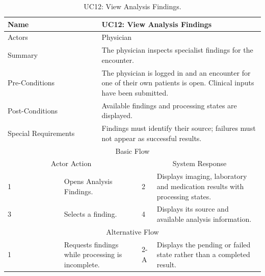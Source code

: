 \begin{table}[htbp]
\centering
\small
\caption{UC12: View Analysis Findings.}
\label{tab:kashaf:uc12}
\begin{tabular}{|p{}|p{}|p{}|p{}|p{}|}
\hline
\multicolumn{2}{|p{\dimexpr0.225\textwidth+2\tabcolsep+\arrayrulewidth\relax}|}{Name} & \multicolumn{3}{p{\dimexpr0.575\textwidth+4\tabcolsep+2\arrayrulewidth\relax}|}{UC12: View Analysis Findings} \\ \hline
\multicolumn{2}{|p{\dimexpr0.225\textwidth+2\tabcolsep+\arrayrulewidth\relax}|}{Actors} & \multicolumn{3}{p{\dimexpr0.575\textwidth+4\tabcolsep+2\arrayrulewidth\relax}|}{Physician} \\ \hline
\multicolumn{2}{|p{\dimexpr0.225\textwidth+2\tabcolsep+\arrayrulewidth\relax}|}{Summary} & \multicolumn{3}{p{\dimexpr0.575\textwidth+4\tabcolsep+2\arrayrulewidth\relax}|}{The physician inspects specialist findings for the encounter.} \\ \hline
\multicolumn{2}{|p{\dimexpr0.225\textwidth+2\tabcolsep+\arrayrulewidth\relax}|}{Pre-Conditions} & \multicolumn{3}{p{\dimexpr0.575\textwidth+4\tabcolsep+2\arrayrulewidth\relax}|}{The physician is logged in and an encounter for one of their own patients is open. Clinical inputs have been submitted.} \\ \hline
\multicolumn{2}{|p{\dimexpr0.225\textwidth+2\tabcolsep+\arrayrulewidth\relax}|}{Post-Conditions} & \multicolumn{3}{p{\dimexpr0.575\textwidth+4\tabcolsep+2\arrayrulewidth\relax}|}{Available findings and processing states are displayed.} \\ \hline
\multicolumn{2}{|p{\dimexpr0.225\textwidth+2\tabcolsep+\arrayrulewidth\relax}|}{Special Requirements} & \multicolumn{3}{p{\dimexpr0.575\textwidth+4\tabcolsep+2\arrayrulewidth\relax}|}{Findings must identify their source; failures must not appear as successful results.} \\ \hline
\multicolumn{5}{|c|}{Basic Flow} \\ \hline
\multicolumn{3}{|c|}{Actor Action} & \multicolumn{2}{c|}{System Response} \\ \hline
1 & \multicolumn{2}{p{\dimexpr0.37\textwidth+2\tabcolsep+\arrayrulewidth\relax}|}{Opens Analysis Findings.} & 2 & Displays imaging, laboratory and medication results with processing states. \\ \hline
3 & \multicolumn{2}{p{\dimexpr0.37\textwidth+2\tabcolsep+\arrayrulewidth\relax}|}{Selects a finding.} & 4 & Displays its source and available analysis information. \\ \hline
\multicolumn{5}{|c|}{Alternative Flow} \\ \hline
1 & \multicolumn{2}{p{\dimexpr0.37\textwidth+2\tabcolsep+\arrayrulewidth\relax}|}{Requests findings while processing is incomplete.} & 2-A & Displays the pending or failed state rather than a completed result. \\ \hline
\end{tabular}
\end{table}

